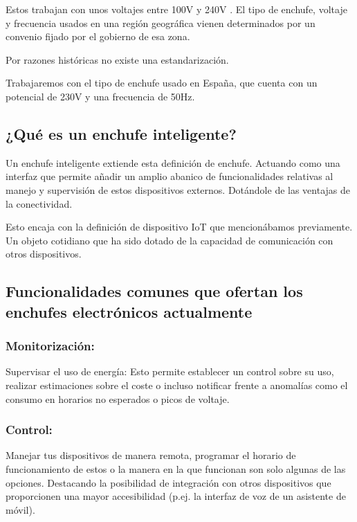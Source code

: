 \documentclass[a4paper,10pt]{article}
\begin{document}
Estos trabajan con unos voltajes entre 100V y 240V
\cite{iecIECWorldPlugs}. El tipo de enchufe, voltaje y frecuencia
usados en una región geográfica vienen determinados por un convenio
fijado por el gobierno de esa zona.

Por razones históricas\cite{nuevatribunaOrigenFrecuenciasElectricas}
no existe una estandarización.

Trabajaremos con el tipo de enchufe usado en España, que cuenta con un
potencial de 230V y una frecuencia de 50Hz\cite{IECWorldPlugs}.


\subsection{¿Qué es un enchufe
inteligente?}\label{quuxe9-es-un-enchufe-inteligente}

Un enchufe inteligente extiende esta definición de enchufe. Actuando
como una interfaz que permite añadir un amplio abanico de
funcionalidades relativas al manejo y supervisión de estos dispositivos
externos. Dotándole de las ventajas de la conectividad.

Esto encaja con la definición de dispositivo IoT que mencionábamos
previamente. Un objeto cotidiano que ha sido dotado de la capacidad de
comunicación con otros dispositivos.

\subsection{Funcionalidades comunes que ofertan los enchufes
electrónicos
actualmente}\label{funcionalidades-comunes-que-ofertan-los-enchufes-electruxf3nicos-actualmente}

\subsubsection{Monitorización:}\label{monitorizaciuxf3n}

Supervisar el uso de energía: Esto permite establecer un control sobre
su uso, realizar estimaciones sobre el coste o incluso notificar frente
a anomalías como el consumo en horarios no esperados o picos de voltaje.

\subsubsection{Control:}\label{control}

Manejar tus dispositivos de manera remota, programar el horario de
funcionamiento de estos o la manera en la que funcionan son solo algunas
de las opciones. Destacando la posibilidad de integración con otros
dispositivos que proporcionen una mayor accesibilidad (p.ej. la interfaz
de voz de un asistente de móvil).
\end{document}
